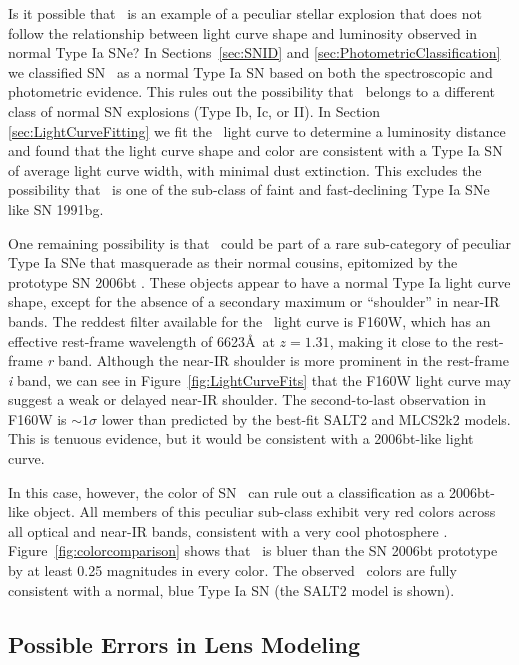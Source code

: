 Is it possible that \tomas\ is an example of a peculiar stellar
explosion that does not follow the relationship between light curve
shape and luminosity observed in normal Type Ia SNe?  In
Sections~\ref{sec:SNID} and \ref{sec:PhotometricClassification} we
classified SN \tomas\ as a normal Type Ia SN based on both the
spectroscopic and photometric evidence.  This rules out the
possibility that \tomas\ belongs to a different class of normal SN
explosions (Type Ib, Ic, or II). In
Section \ref{sec:LightCurveFitting} we fit the \tomas\ light curve to
determine a luminosity distance and found that the light curve shape
and color are consistent with a Type Ia SN of average light curve
width, with minimal dust extinction.  This excludes the possibility
that \tomas\ is one of the sub-class of faint and fast-declining Type
Ia SNe like SN 1991bg.

One remaining possibility is that \tomas\ could be part of a rare
sub-category of peculiar Type Ia SNe that masquerade as their normal
cousins, epitomized by the prototype SN 2006bt \citep{Foley:2010}.
These objects appear to have a normal Type Ia light curve shape,
except for the absence of a secondary maximum or ``shoulder'' in
near-IR bands.  The reddest filter available for the \tomas\ light
curve is F160W, which has an effective rest-frame wavelength of
6623\AA\ at $z=1.31$, making it close to the rest-frame {\it r} band.
Although the near-IR shoulder is more prominent in the rest-frame {\it
i} band, we can see in Figure~\ref{fig:LightCurveFits} that the F160W
light curve may suggest a weak or delayed near-IR shoulder.  The
second-to-last observation in F160W is $\sim1\sigma$ lower than
predicted by the best-fit SALT2 and MLCS2k2 models. This is tenuous
evidence, but it would be consistent with a 2006bt-like light curve.

In this case, however, the color of SN \tomas\ can rule out a
classification as a 2006bt-like object.  All members of this peculiar
sub-class exhibit very red colors across all optical and near-IR
bands, consistent with a very cool photosphere \citep{Foley:2010}.
Figure~\ref{fig:colorcomparison} shows that \tomas\ is bluer than the
SN 2006bt prototype by at least 0.25 magnitudes in every color. The
observed \tomas\ colors are fully consistent with a normal, blue
Type Ia SN (the SALT2 model is shown).



\subsection{Possible Errors in Lens Modeling}
\label{sec:LensModelComparison}

